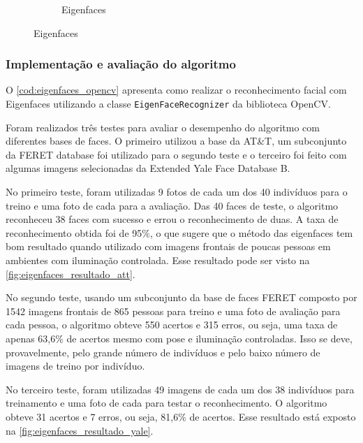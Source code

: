 \begin{figure}[htbp]
\begin{subfigure}[t]{0.3\textwidth}
    \caption{Eigenfaces}
    \end{subfigure}
\end{figure}

\subsubsection{Implementação e avaliação do algoritmo}\label{sec:eigenfaces_testes}

O \autoref{cod:eigenfaces_opencv} apresenta como realizar o reconhecimento facial com Eigenfaces utilizando a classe \texttt{EigenFaceRecognizer} da biblioteca OpenCV.

Foram realizados três testes para avaliar o desempenho do algoritmo com diferentes bases de faces. O primeiro utilizou a base da AT\&T, um subconjunto da FERET database foi utilizado para o segundo teste e o terceiro foi feito com algumas imagens selecionadas da Extended Yale Face Database B.

No primeiro teste, foram utilizadas 9 fotos de cada um dos 40 indivíduos para o treino e uma foto de cada para a avaliação.
Das 40 faces de teste, o algoritmo reconheceu 38 faces com sucesso e errou o reconhecimento de duas. A taxa de reconhecimento obtida foi de 95\%, o que sugere que o método das eigenfaces tem bom resultado quando utilizado com imagens frontais de poucas pessoas em ambientes com iluminação controlada. Esse resultado pode ser visto na \autoref{fig:eigenfaces_resultado_att}.

No segundo teste, usando um subconjunto da base de faces FERET composto por 1542 imagens frontais de 865 pessoas para treino e uma foto de avaliação para cada pessoa, o algoritmo obteve 550 acertos e 315 erros, ou seja, uma taxa de apenas 63,6\% de acertos mesmo com pose e iluminação controladas. Isso se deve, provavelmente, pelo grande número de indivíduos e pelo baixo número de imagens de treino por indivíduo.

No terceiro teste, foram utilizadas 49 imagens de cada um dos 38 indivíduos para treinamento e uma foto de cada para testar o reconhecimento. O algoritmo obteve 31 acertos e 7 erros, ou seja, 81,6\% de acertos. Esse resultado está exposto na \autoref{fig:eigenfaces_resultado_yale}.


